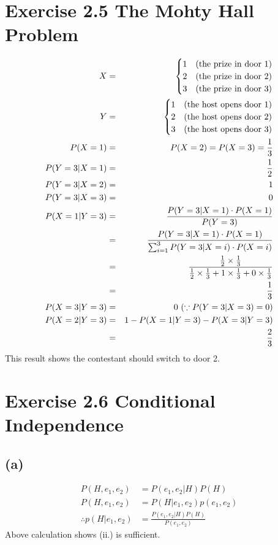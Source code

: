 \documentclass{jsarticle}
\begin{document}
\section*{Exercise 2.5 The Mohty Hall Problem}
\begin{eqnarray}
X & = & \begin{cases}
1  & (\rm the\ prize\ in\ door\ 1) \\
2  & (\rm the\ prize\ in\ door\ 2) \\
3  & (\rm the\ prize\ in\ door\ 3)
\end{cases}\\
Y & = & \begin{cases}
1  & (\rm the\ host\ opens\ door\ 1)\\
2  & (\rm the\ host\ opens\ door\ 2)\\
3  & (\rm the\ host\ opens\ door\ 3)
\end{cases}\\
P(X=1) & = & P(X=2) = P(X=3) = \frac{1}{3}\\
P(Y=3|X=1) & = & \frac{1}{2}\\
P(Y=3|X=2) & = & 1\\
P(Y=3|X=3) & = & 0\\
P(X=1|Y=3) & = & \frac{P(Y=3|X=1)\cdot P(X=1)}{P(Y=3)}\\
& = & \frac{P(Y=3|X=1)\cdot P(X=1)}{\sum_{i=1}^{3}P(Y=3|X=i)\cdot P(X=i)}\\
& = & \frac{\frac{1}{2}\times \frac{1}{3}}{\frac{1}{2}\times \frac{1}{3} + 1 \times \frac{1}{3}+0\times \frac{1}{3}}\\
& = & \frac{1}{3}\\
P(X=3|Y=3) & = & 0\ (\because P(Y=3|X=3)=0)\\
P(X=2|Y=3) & = & 1 - P(X=1|Y=3) - P(X=3|Y=3)\\
& = & \frac{2}{3}
\end{eqnarray}
This result shows the contestant should switch to door 2.

\section*{Exercise 2.6 Conditional Independence}
\subsection*{(a)}
\begin{align}
P(H,e_1,e_2) & = P(e_1,e_2|H)P(H)\\
P(H,e_1,e_2) & = P(H|e_1,e_2)p(e_1,e_2)\\
\therefore p(H|e_1,e_2) & =\frac{P(e_1,e_2|H)P(H)}{P(e_1,e_2)}
\end{align}
Above calculation shows (ii.) is sufficient. 
\end{document}

